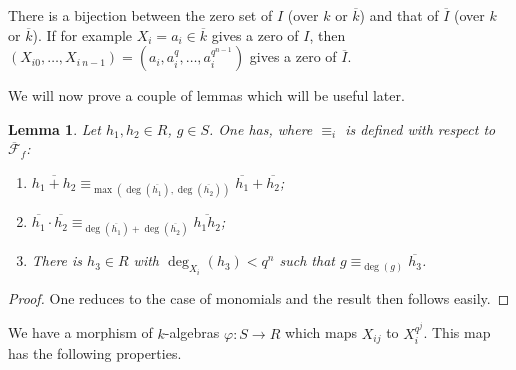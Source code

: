\documentclass{amsart}
\theoremstyle{plain}
\newtheorem{lemma}[theorem]{Lemma}
\theoremstyle{definition}
\begin{document}
There is a bijection between the zero set of $I$ (over $k$ or $\overline{k}$) and that of $\overline{I}$ (over $k$ or $\overline{k}$). If for example $X_i=a_i \in \overline{k}$ gives a zero of $I$, then $(X_{i0},\ldots,X_{i\ n-1})=(a_i,a_i^q,\ldots,a_i^{q^{n-1}})$ gives a zero of $\overline{I}$. 

We will now prove a couple of lemmas which will be useful later.

\begin{lemma} \label{544}
Let $h_1, h_2 \in R$, $g \in S$. One has, where $\equiv_i$ is defined with respect to $\overline{\mathcal{F}}_f$:
\begin{enumerate}
\item $ \overline{h_1+h_2} \equiv_{\max(\deg(\overline{h_1}),\deg(\overline{h_2}))} \overline{h_1}+\overline{h_2}$;
\item $\overline{h_1} \cdot \overline{h_2} \equiv_{\deg(\overline{h_1})+\deg(\overline{h_2})} \overline{h_1 h_2}$;
\item There is $h_3 \in R$ with $\deg_{X_i}(h_3)<q^n$ such that $g \equiv_{\deg(g)} \overline{h_3}$.
\end{enumerate}
\end{lemma}
\begin{proof}
One reduces to the case of monomials and the result then follows easily.
\end{proof}

We have a morphism of $k$-algebras $\varphi: S \to R$ which maps $X_{ij}$ to $X_i^{q^j}$. This map has the following properties.
\end{document}
